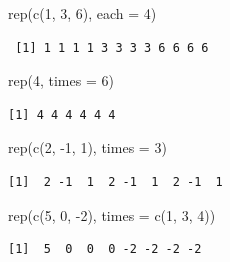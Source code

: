 \documentclass[
  letterpaper,
  DIV=11,
  numbers=noendperiod]{scrreprt}
\newenvironment{Shaded}{\begin{snugshade}}{\end{snugshade}}
\newcommand{\AttributeTok}[1]{\textcolor[rgb]{0.40,0.45,0.13}{#1}}
\newcommand{\DecValTok}[1]{\textcolor[rgb]{0.68,0.00,0.00}{#1}}
\newcommand{\FunctionTok}[1]{\textcolor[rgb]{0.28,0.35,0.67}{#1}}
\newcommand{\NormalTok}[1]{\textcolor[rgb]{0.00,0.23,0.31}{#1}}
\newcommand{\SpecialCharTok}[1]{\textcolor[rgb]{0.37,0.37,0.37}{#1}}
\begin{document}
\begin{tcolorbox}[enhanced jigsaw, colbacktitle=quarto-callout-tip-color!10!white, opacitybacktitle=0.6, breakable, left=2mm, leftrule=.75mm, toprule=.15mm, toptitle=1mm, bottomtitle=1mm, colframe=quarto-callout-tip-color-frame, opacityback=0, coltitle=black, arc=.35mm, titlerule=0mm, colback=white, bottomrule=.15mm, title=\textcolor{quarto-callout-tip-color}{\faLightbulb}\hspace{0.5em}{Answer}, rightrule=.15mm]

\begin{Shaded}
\begin{Highlighting}[]
\FunctionTok{rep}\NormalTok{(}\FunctionTok{c}\NormalTok{(}\DecValTok{1}\NormalTok{, }\DecValTok{3}\NormalTok{, }\DecValTok{6}\NormalTok{), }\AttributeTok{each =} \DecValTok{4}\NormalTok{)}
\end{Highlighting}
\end{Shaded}

\begin{verbatim}
 [1] 1 1 1 1 3 3 3 3 6 6 6 6
\end{verbatim}

\begin{Shaded}
\begin{Highlighting}[]
\FunctionTok{rep}\NormalTok{(}\DecValTok{4}\NormalTok{, }\AttributeTok{times =} \DecValTok{6}\NormalTok{)}
\end{Highlighting}
\end{Shaded}

\begin{verbatim}
[1] 4 4 4 4 4 4
\end{verbatim}

\begin{Shaded}
\begin{Highlighting}[]
\FunctionTok{rep}\NormalTok{(}\FunctionTok{c}\NormalTok{(}\DecValTok{2}\NormalTok{, }\SpecialCharTok{{-}}\DecValTok{1}\NormalTok{, }\DecValTok{1}\NormalTok{), }\AttributeTok{times =} \DecValTok{3}\NormalTok{)}
\end{Highlighting}
\end{Shaded}

\begin{verbatim}
[1]  2 -1  1  2 -1  1  2 -1  1
\end{verbatim}

\begin{Shaded}
\begin{Highlighting}[]
\FunctionTok{rep}\NormalTok{(}\FunctionTok{c}\NormalTok{(}\DecValTok{5}\NormalTok{, }\DecValTok{0}\NormalTok{, }\SpecialCharTok{{-}}\DecValTok{2}\NormalTok{), }\AttributeTok{times =} \FunctionTok{c}\NormalTok{(}\DecValTok{1}\NormalTok{, }\DecValTok{3}\NormalTok{, }\DecValTok{4}\NormalTok{))}
\end{Highlighting}
\end{Shaded}

\begin{verbatim}
[1]  5  0  0  0 -2 -2 -2 -2
\end{verbatim}

\end{tcolorbox}
\end{document}
